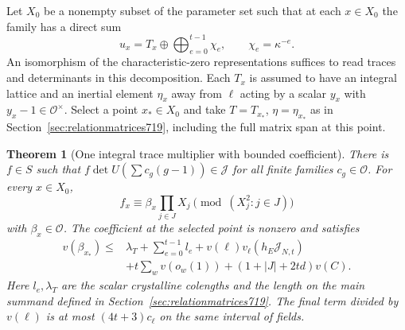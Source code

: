 \documentclass[a4paper,11pt]{article}
\newtheorem{theorem}[proposition]{Theorem}
\theoremstyle{definition}
\theoremstyle{remark}
\numberwithin{equation}{section}
\begin{document}
Let \(X_0\) be a nonempty subset of the parameter set such
that at each \(x\in X_0\) the family has a direct sum
\[
           u_x=T_x\oplus\bigoplus_{e=0}^{t-1}\chi_e,\qquad
                        \chi_e=\kappa^{-e}.
\]
An isomorphism of the characteristic-zero representations
suffices to read traces and determinants in this decomposition.
Each \(T_x\) is assumed to have an integral lattice and an
inertial element \(\eta_x\) away from \(\ell\) acting by a
scalar \(y_x\) with \(y_x-1\in\mathcal O^\times\). Select a
point \(x_*\in X_0\) and take \(T=T_{x_*}\), \(\eta=\eta_{x_*}\)
as in Section~\ref{sec:relationmatrices719}, including the
full matrix span at this point.

\begin{theorem}[One integral trace multiplier with bounded coefficient]
\leavevmode\label{thm:ribettrace720}
There is \(f\in S\) such that
\(f\det U(\sum c_g(g-1))\in\mathcal J\) for all finite
families \(c_g\in\mathcal O\). For every \(x\in X_0\),
\[
                     f_x\equiv\beta_x\prod_{j\in J}X_j
                             \pmod{(X_j^2:j\in J)}
\]
with \(\beta_x\in\mathcal O\). The coefficient at the selected
point is nonzero and satisfies
\[
 \begin{split}
 v(\beta_{x_*})\le {}&
   \lambda_T+\sum_{e=0}^{t-1}l_e+
                  v(\ell)v_\ell(h_E\mathcal J_{N,t})\\
 &+t\sum_w v(o_w(1))
      +(1+|J|+2td)v(C).
 \end{split}
\]
Here \(l_e,\lambda_T\) are the scalar crystalline colengths
and the length on the main summand defined in
Section~\ref{sec:relationmatrices719}. The final term divided
by \(v(\ell)\) is at most \((4t+3)c_\ell\) on the same
interval of fields.
\end{theorem}
\end{document}
